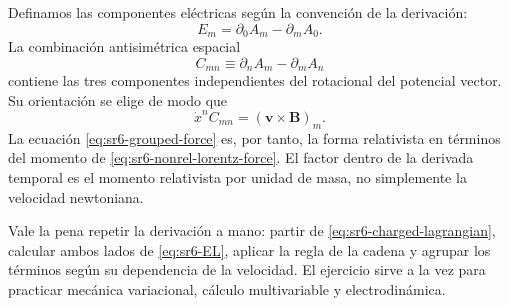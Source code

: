 Definamos las componentes eléctricas según la convención de la derivación:
\begin{equation}
E_m=\partial_0A_m-\partial_mA_0.
\label{eq:sr6-electric-from-potential}
\end{equation}
La combinación antisimétrica espacial
\begin{equation}
C_{mn}
\equiv
\partial_nA_m-\partial_mA_n
\label{eq:sr6-spatial-curl-tensor}
\end{equation}
contiene las tres componentes independientes del rotacional del potencial vector. Su orientación se elige de modo que
\begin{equation}
\dot x^nC_{mn}
=
\left(\mathbf v\times\mathbf B\right)_m.
\end{equation}
La ecuación \eqref{eq:sr6-grouped-force} es, por tanto, la forma relativista en términos del momento de \eqref{eq:sr6-nonrel-lorentz-force}. El factor dentro de la derivada temporal es el momento relativista por unidad de masa, no simplemente la velocidad newtoniana.

Vale la pena repetir la derivación a mano: partir de \eqref{eq:sr6-charged-lagrangian}, calcular ambos lados de \eqref{eq:sr6-EL}, aplicar la regla de la cadena y agrupar los términos según su dependencia de la velocidad. El ejercicio sirve a la vez para practicar mecánica variacional, cálculo multivariable y electrodinámica.

\begin{classroomqa}\end{classroomqa}

\begin{classroomqa}\end{classroomqa}


